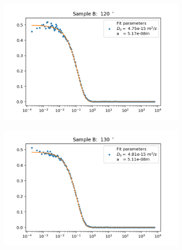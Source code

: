 \documentclass[]{article}
\begin{document}
\begin{figure}[!h]
\medskip
\begin{subfigure}{0.48\textwidth}
\includegraphics[width=\linewidth]{Plots/B/120.png}
\end{subfigure}
\begin{subfigure}[c]{0.48\linewidth}
\includegraphics[width=\linewidth]{Plots/B/130.png}
\end{subfigure}


\end{figure}
\end{document}
